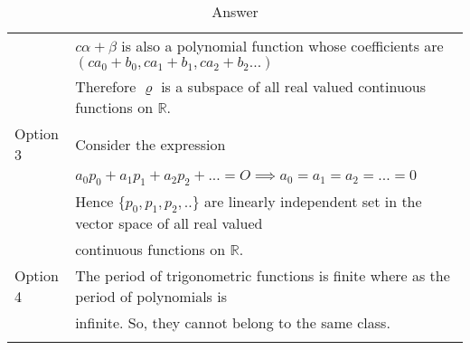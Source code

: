 \documentclass[journal,12pt]{IEEEtran}
\begin{document}
\begin{longtable}{|l|l|}
    &$c\alpha+\beta$ is also a polynomial function whose coefficients are $(ca_0+b_0,ca_1+b_1,ca_2+b_2...)$\\
    &Therefore $\varrho$ is a subspace of all real valued continuous functions on $\mathbb{R}$.\\
    \hline
    Option 3&Consider the expression\\
    &$a_0p_0+a_1p_1+a_2p_2+...=O\implies a_0=a_1=a_2=...=0$\\
    &Hence $\{p_0,p_1,p_2,..\}$ are linearly independent set in the vector space of all real valued \\
    &continuous functions on $\mathbb{R}$.\\
    \hline
    Option 4&The period of trigonometric functions is finite where as the period of polynomials is \\
    &infinite. So, they cannot belong to the same class.\\
    \hline
    \caption{Answer}
    \label{tab:Ans}
\end{longtable}
\end{document}
